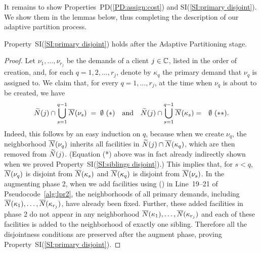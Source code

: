 \documentclass[11pt]{article}
\begin{document}
It remains to show Properties~PD(\ref{PD:assign:cost}) and
SI(\ref{SI:primary disjoint}). We show them in the lemmas
below, thus completing the description of our adaptive
partition process.



\begin{lemma}\label{lem: property SI:primary disjoint holds}
  Property~SI(\ref{SI:primary disjoint}) holds after the
  Adaptive Partitioning stage.
\end{lemma}
\begin{proof}
  Let $\nu_1,\ldots,\nu_{r_j}$ be the demands of a client
  $j\in\mathbb{C}$, listed in the order of creation, and,
  for each $q=1,2,\ldots,r_j$, denote by $\kappa_q$ the
  primary demand that $\nu_q$ is assigned to.  We claim
  that, for every $q=1,\ldots,r_j$, at the time when $\nu_q$
  is about to be created, we have
%
\begin{eqnarray*}
{\widetilde N}(j) \cap \bigcup_{s=1}^{q-1} {\overline{N}}(\nu_s) \;=\;
\emptyset\ (*)\quad\textrm{and} \quad
{\widetilde N}(j) \cap \bigcup_{s=1}^{q-1} {\overline{N}}(\kappa_s) &=&
\emptyset\ (**).
\end{eqnarray*}
%
Indeed, this follows by an easy induction on $q$, because
when we create $\nu_q$, the neighborhood ${\overline{N}}(\nu_q)$
inherits all facilities in ${\widetilde N}(j)\cap
{\overline{N}}(\kappa_q)$, which are then removed from
${\widetilde N}(j)$. (Equation (*) above was in fact already
indirectly shown when we proved Property~SI(\ref{SI:siblings
  disjoint}).) This implies that, for $s < q$,
${\overline{N}}(\nu_q)$ is disjoint from ${\overline{N}}(\kappa_s)$ and
${\overline{N}}(\kappa_q)$ is disjoint from ${\overline{N}}(\nu_s)$. In the
augmenting phase 2, when we add facilities using
\AugmentToUnit() in Line~19--21 of
Pseudocode~\ref{alg:lpr2}, the neighborhoods of all primary
demands, including ${\overline{N}}(\kappa_1), \ldots,
{\overline{N}}(\kappa_{r_j})$, have already been fixed. Further,
these added facilities in phase 2 do not appear in any
neighborhood ${\overline{N}}(\kappa_1), \ldots,
{\overline{N}}(\kappa_{r_j})$ and each of these facilities is added
to the neighborhood of exactly one sibling.  Therefore all
the disjointness conditions are preserved after the augment
phase, proving Property~SI(\ref{SI:primary disjoint}).
\end{proof}
\end{document}
